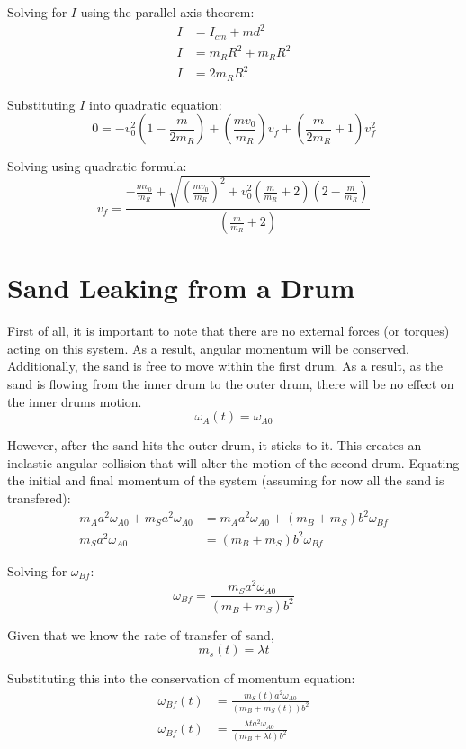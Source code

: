 \documentclass{article}
\begin{document}
Solving for $I$ using the parallel axis theorem:
\begin{align*}
    I &= I_{cm} + m d^2 \\
    I &= m_R R^2 + m_R R^2 \\
    I &= 2 m_R R^2
\end{align*}

Substituting $I$ into quadratic equation:
$$ 0 = -v_0^2 \left( 1 - \frac{m}{2 m_R} \right) + \left( \frac{m v_0}{m_R}
\right) v_f + \left( \frac{m}{2 m_R} + 1 \right) v_f^2$$

Solving using quadratic formula:
$$ v_f = \frac{ -\frac{m v_0}{m_R} + \sqrt{ \left( \frac{m v_0}{m_R} \right)^2 +
v_0^2 \left( \frac{m}{m_R} + 2 \right) \left( 2 - \frac{m}{m_R}
\right) }}{ \left( \frac{m}{m_R} + 2 \right)}$$

\section{Sand Leaking from a Drum}

First of all, it is important to note that there are no external forces (or
torques) acting on this system. As a result, angular momentum will be conserved.
Additionally, the sand is free to move within the first drum. As a result, as
the sand is flowing from the inner drum to the outer drum, there will be no
effect on the inner drums motion.
$$\omega_A(t) = \omega_{A0}$$

However, after the sand hits the outer drum, it sticks to it. This creates an
inelastic angular collision that will alter the motion of the second drum.
Equating the initial and final momentum of the system (assuming for now all the
sand is transfered):
\begin{align*}
    m_A a^2 \omega_{A0} + m_S a^2 \omega_{A0} &= m_A a^2 \omega_{A0} + (m_B +
    m_S) b^2 \omega_{Bf} \\
    m_S a^2 \omega_{A0} &= (m_B + m_S) b^2 \omega_{Bf}
\end{align*}

Solving for $\omega_{Bf}$:
$$\omega_{Bf} = \frac{m_S a^2 \omega_{A0}}{(m_B + m_S) b^2}$$

Given that we know the rate of transfer of sand, 
$$m_s(t) = \lambda t$$

Substituting this into the conservation of momentum equation:
\begin{align*}
    \omega_{Bf}(t) &= \frac{m_S(t) a^2 \omega_{A0}}{(m_B + m_S(t)) b^2} \\
    \omega_{Bf}(t) &= \frac{\lambda t a^2 \omega_{A0}}{(m_B + \lambda t) b^2}
\end{align*}
\end{document}
